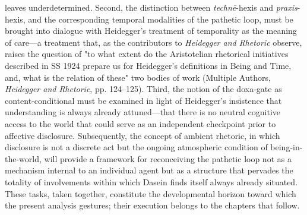 \documentclass{article}
\begin{document}
leaves underdetermined. Second, the distinction between \textit{technē}-hexis and \textit{praxis}-hexis, and the corresponding temporal modalities of the pathetic loop, must be brought into dialogue with Heidegger's treatment of temporality as the meaning of care—a treatment that, as the contributors to \textit{Heidegger and Rhetoric} observe, raises the question of "to what extent do the Aristotelian rhetorical initiatives described in SS 1924 prepare us for Heidegger's definitions in Being and Time, and, what is the relation of these" two bodies of work (Multiple Authors, \textit{Heidegger and Rhetoric}, pp. 124–125). Third, the notion of the doxa-gate as content-conditional must be examined in light of Heidegger's insistence that understanding is always already attuned—that there is no neutral cognitive access to the world that could serve as an independent checkpoint prior to affective disclosure. Subsequently, the concept of ambient rhetoric, in which disclosure is not a discrete act but the ongoing atmospheric condition of being-in-the-world, will provide a framework for reconceiving the pathetic loop not as a mechanism internal to an individual agent but as a structure that pervades the totality of involvements within which Dasein finds itself always already situated. These tasks, taken together, constitute the developmental horizon toward which the present analysis gestures; their execution belongs to the chapters that follow.
\end{document}
